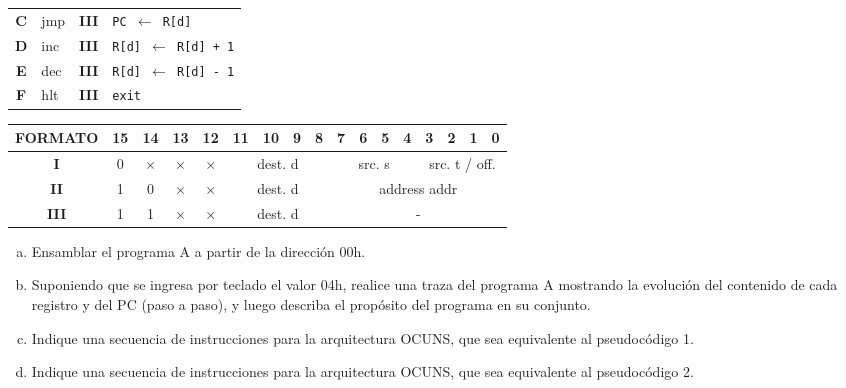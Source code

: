 \documentclass[12pt,a4paper]{article}
\begin{document}
\begin{small}
\begin{minipage}{.6\textwidth}
\begin{tabular}{|c|l|c|l|}
			\textbf{C} & \textsf{jmp}   & \textbf{III} & \texttt{PC $\leftarrow$ R[d]} \\
			\textbf{D} & \textsf{inc}   & \textbf{III} & \texttt{R[d] $\leftarrow$ R[d] + 1} \\
			\textbf{E} & \textsf{dec}   & \textbf{III} & \texttt{R[d] $\leftarrow$ R[d] - 1} \\
			\textbf{F} & \textsf{hlt}   & \textbf{III} & \texttt{exit} \\ \hline
		\end{tabular}	
	\end{minipage}
	\begin{center}
		\begin{tabular}{*{17}{c}}
			\textsf{FORMATO} & 15 & 14 & 13 & 12 & 11 & 10 & 9 & 8 & 7 & 6 & 5 & 4 & 3 & 2 & 1 & 0 \\ \hline
			\multicolumn{1}{|c|}{\textbf{I}} & 0 & $\times$ & $\times$ & $\times$ &
			\multicolumn{4}{|c|}{\textsf{dest. d}} &
			\multicolumn{4}{|c|}{\textsf{src. s}} &
			\multicolumn{4}{|c|}{\textsf{src. t / off.}} \\ \hline
			\multicolumn{1}{|c|}{\textbf{II}} & 1 & 0 & $\times$ & $\times$ &
			\multicolumn{4}{|c|}{\textsf{dest. d}} &
			\multicolumn{8}{|c|}{\textsf{address addr}} \\ \hline
			\multicolumn{1}{|c|}{\textbf{III}} & 1 & 1 & $\times$ & $\times$ &
			\multicolumn{4}{|c|}{\textsf{dest. d}} &
			\multicolumn{8}{|c|}{\textsf{-}} \\ \hline
		\end{tabular}
	\end{center}		
\end{small}
\begin{small}
\begin{enumerate}[a)]
	\item Ensamblar el programa A a partir de la dirección 00h.
	\item Suponiendo que se ingresa por teclado el valor 04h, realice una traza del programa A mostrando la evolución del contenido de cada registro y del PC (paso a paso), y luego describa el propósito del programa en su conjunto.
	\item Indique una secuencia de instrucciones para la arquitectura OCUNS, que sea equivalente al pseudocódigo 1.
	\item Indique una secuencia de instrucciones para la arquitectura OCUNS, que sea equivalente al pseudocódigo 2.	
\end{enumerate}
\end{small}
\end{document}
